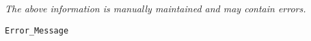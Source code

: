 \label{pkg:error\_message}

{\tiny \it The above information is manually maintained and may contain errors.}
\begin{verbatim}
Error_Message
\end{verbatim}
